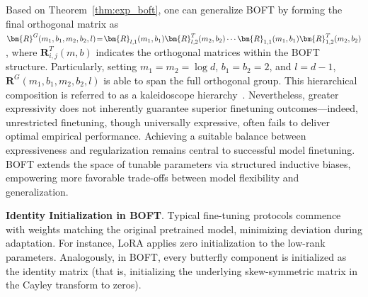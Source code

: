 Based on Theorem~\ref{thm:exp_boft}, one can generalize BOFT by forming the final orthogonal matrix as $\thickmuskip=2mu \medmuskip=2mu \bm{R}^G(m_1,b_1,m_2,b_2,l)=\bm{R}_{l,1}(m_1,b_1)\bm{R}_{l,2}^T(m_2,b_2)\cdots\bm{R}_{1,1}(m_1,b_1)\bm{R}_{1,2}^T(m_2,b_2)$, where $\bm{R}_{i,j}^T(m,b)$ indicates the orthogonal matrices within the BOFT structure. Particularly, setting $m_1=m_2=\log d$, $b_1=b_2=2$, and $l=d-1$, $\bm{R}^G(m_1,b_1,m_2,b_2,l)$ is able to span the full orthogonal group. This hierarchical composition is referred to as a kaleidoscope hierarchy~\cite{dao2019kaleidoscope}. Nevertheless, greater expressivity does not inherently guarantee superior finetuning outcomes—indeed, unrestricted finetuning, though universally expressive, often fails to deliver optimal empirical performance. Achieving a suitable balance between expressiveness and regularization remains central to successful model finetuning. BOFT extends the space of tunable parameters via structured inductive biases, empowering more favorable trade-offs between model flexibility and generalization.

\textbf{Identity Initialization in BOFT}. Typical fine-tuning protocols commence with weights matching the original pretrained model, minimizing deviation during adaptation. For instance, LoRA applies zero initialization to the low-rank parameters. Analogously, in BOFT, every butterfly component is initialized as the identity matrix (that is, initializing the underlying skew-symmetric matrix in the Cayley transform to zeros).

